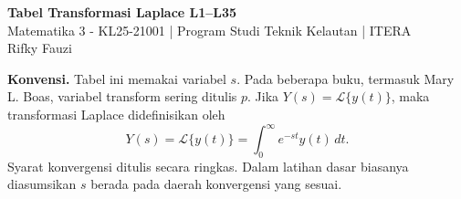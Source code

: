\documentclass[10pt,a4paper]{article}
\newcommand{\Lcal}{\mathcal{L}}
\newcommand{\Lap}[1]{\Lcal\{#1\}}
\begin{document}
\begin{center}
{\Large\bfseries\color{iteraBlue} Tabel Transformasi Laplace L1--L35}\\[2mm]
{\normalsize Matematika 3 - KL25-21001 | Program Studi Teknik Kelautan | ITERA}\\[1mm]
{\normalsize Rifky Fauzi}
\end{center}
\vspace{2mm}

\noindent\textbf{Konvensi.} Tabel ini memakai variabel $s$. Pada beberapa buku, termasuk Mary L. Boas, variabel transform sering ditulis $p$. Jika $Y(s)=\Lap{y(t)}$, maka transformasi Laplace didefinisikan oleh
\[
Y(s)=\Lap{y(t)}=\int_0^\infty e^{-st}y(t)\,dt.
\]
Syarat konvergensi ditulis secara ringkas. Dalam latihan dasar biasanya diasumsikan $s$ berada pada daerah konvergensi yang sesuai.
\end{document}
